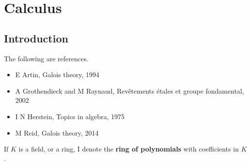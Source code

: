 \documentclass[../Year1/Year1.tex]{subfiles}
\begin{document}
\chapter{Calculus}
\renewcommand*\thesection{\arabic{section}}

\section{Introduction}


The following are references.
\begin{itemize}
\item E Artin, Galois theory, 1994
\item A Grothendieck and M Raynaud, Rev\^etements \'etales et groupe fondamental, 2002
\item I N Herstein, Topics in algebra, 1975
\item M Reid, Galois theory, 2014
\end{itemize}

\begin{notation*}
If $ K $ is a field, or a ring, I denote
the \textbf{ring of polynomials} with coefficients in $ K $.
\end{notation*}
\end{document}
